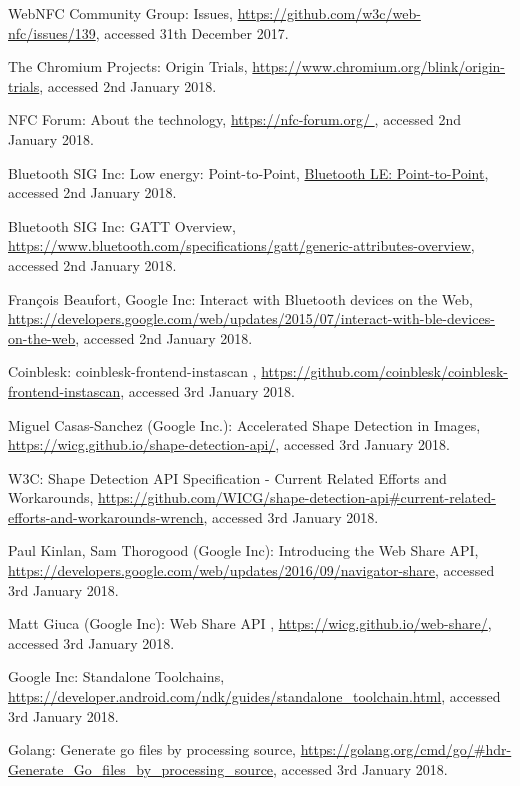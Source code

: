 \begin{thebibliography}{99}
WebNFC Community Group: Issues, \url{https://github.com/w3c/web-nfc/issues/139}, accessed 31th December 2017.

The Chromium Projects: Origin Trials, \url{https://www.chromium.org/blink/origin-trials}, accessed 2nd January 2018.

NFC Forum: About the technology, \url{https://nfc-forum.org/
}, accessed 2nd January 2018.

Bluetooth SIG Inc: Low energy: Point-to-Point, \url{Bluetooth LE: Point-to-Point}, accessed 2nd January 2018.

Bluetooth SIG Inc: GATT Overview, \url{https://www.bluetooth.com/specifications/gatt/generic-attributes-overview}, accessed 2nd January 2018.

François Beaufort, Google Inc: Interact with Bluetooth devices on the Web, \url{https://developers.google.com/web/updates/2015/07/interact-with-ble-devices-on-the-web}, accessed 2nd January 2018.

Coinblesk: coinblesk-frontend-instascan
, \url{https://github.com/coinblesk/coinblesk-frontend-instascan}, accessed 3rd January 2018.

Miguel Casas-Sanchez (Google Inc.): Accelerated Shape Detection in Images, \url{https://wicg.github.io/shape-detection-api/}, accessed 3rd January 2018.

W3C: Shape Detection API Specification 
- Current Related Efforts and Workarounds, \url{https://github.com/WICG/shape-detection-api#current-related-efforts-and-workarounds-wrench}, accessed 3rd January 2018.

 Paul Kinlan, Sam Thorogood (Google Inc): Introducing the Web Share API, \url{https://developers.google.com/web/updates/2016/09/navigator-share}, accessed 3rd January 2018.

 Matt Giuca (Google Inc): Web Share API
, \url{https://wicg.github.io/web-share/}, accessed 3rd January 2018.

 Google Inc: Standalone Toolchains, \url{https://developer.android.com/ndk/guides/standalone_toolchain.html}, accessed 3rd January 2018.

 Golang: Generate go files by processing source, \url{https://golang.org/cmd/go/#hdr-Generate_Go_files_by_processing_source}, accessed 3rd January 2018.


\end{thebibliography}
